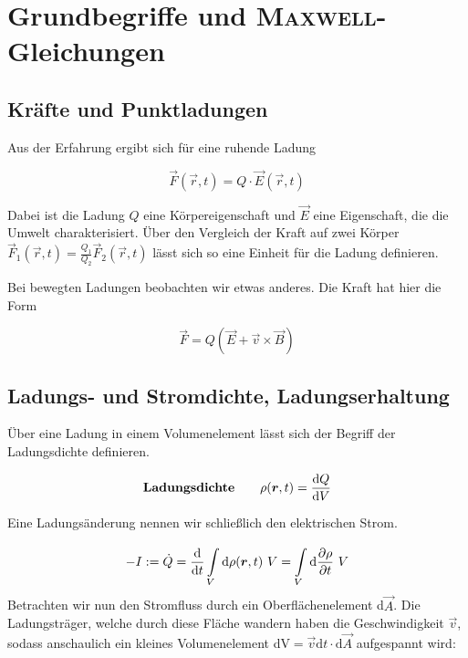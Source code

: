 
\chapter{Grundbegriffe und \textsc{Maxwell}-Gleichungen}
\section{Kräfte und Punktladungen}

Aus der Erfahrung ergibt sich für eine ruhende Ladung

\begin{equation*}
\vec{F}(\vec{r},t)=Q\cdot\vec{E}(\vec{r},t)
\end{equation*}

Dabei ist die Ladung $Q$ eine Körpereigenschaft und $\vec{E}$ eine Eigenschaft, die die Umwelt charakterisiert. Über den Vergleich der Kraft auf zwei Körper $\vec{F}_1(\vec{r},t)=\frac{Q_1}{Q_2}\vec{F}_2(\vec{r},t)$ lässt sich so eine Einheit für die Ladung definieren.\\
\linebreak

Bei bewegten Ladungen beobachten wir etwas anderes. Die Kraft hat hier die Form

\begin{equation*}
\vec{F}=Q(\vec{E}+\vec{v}\times\vec{B})
\end{equation*}

\section{Ladungs- und Stromdichte, Ladungserhaltung}

Über eine Ladung in einem Volumenelement lässt sich der Begriff der Ladungsdichte definieren.

\begin{equation*}
\textbf{Ladungsdichte}\qquad\rho(\bm{r},t)=\frac{\mathrm{d}{Q}}{\mathrm{d}{V}}
\end{equation*}

Eine Ladungsänderung nennen wir schließlich den elektrischen Strom.

\begin{equation*}
-I:=\dot{Q}=\frac{\mathrm{d}{}}{\mathrm{d}{t}}\int\limits_{{V}}^{{}}\mathrm{d}{\rho(\bm{r},t)}\ {V}=\int\limits_{{V}}^{{}}\mathrm{d}{\frac{\partial{\rho}}{\partial{t}}}\ {V}
\end{equation*}	
Betrachten wir nun den Stromfluss durch ein Oberflächenelement d$\vec{A}$. Die Ladungsträger, welche durch diese Fläche wandern haben die Geschwindigkeit $\vec{v}$, sodass anschaulich ein kleines Volumenelement dV$ = \vec{v}\mathrm{d}t\cdot\mathrm{d}\vec{A}$ aufgespannt wird:

